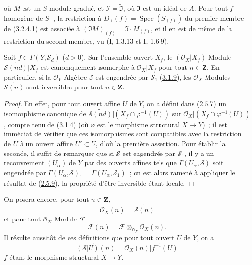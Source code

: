 
où $M$ est un $S$-module gradué, et
$\mathcal{I}=\widetilde{\mathfrak{I}}$, où $\mathfrak{I}$ est un idéal de
$A$. Pour tout $f$ homogène de $S_+$, la restriction à
$D_+(f)=\operatorname{Spec}(S_{(f)})$ du premier membre de
(\hyperref[II.3.2.4.1-fr]{3.2.4.1}) est associée à
$(\mathfrak{I}M)_{(f)}=\mathfrak{I}\cdot M_{(f)}$, et il en est de même de la
restriction du second membre, vu
(\hyperref[I.1.3.13-fr]{I, 1.3.13} et
\hyperref[I.1.6.9-fr]{I, 1.6.9}).

\begin{proposition}[3.2.5]
\label{II.3.2.5-fr}
Soit $f\in\Gamma(Y,\mathcal{S}_d)$ ($d>0$). Sur l'ensemble ouvert $X_f$, le
$(\mathcal{O}_X|X_f)$-Module
$\widetilde{\mathcal{S}(nd)}|X_f$ est canoniquement isomorphe à
$\mathcal{O}_X|X_f$ pour tout $n\in\mathbf{Z}$. En particulier, si la
$\mathcal{O}_Y$-Algèbre $\mathcal{S}$ est engendrée par $\mathcal{S}_1$
(\hyperref[II.3.1.9-fr]{3.1.9}), les $\mathcal{O}_X$-Modules
$\widetilde{\mathcal{S}(n)}$ sont inversibles pour tout $n\in\mathbf{Z}$.
\end{proposition}

\begin{proof}
En effet, pour tout ouvert affine $U$ de $Y$, on a défini dans
(\hyperref[II.2.5.7-fr]{2.5.7}) un isomorphisme canonique de
$\widetilde{\mathcal{S}(nd)}|(X_f\cap\varphi^{-1}(U))$ sur
$\mathcal{O}_X|(X_f\cap\varphi^{-1}(U))$, compte tenu de
(\hyperref[II.3.1.4-fr]{3.1.4}) (où $\varphi$ est le morphisme structural
$X\to Y$)~; il est immédiat de vérifier que ces isomorphismes sont compatibles
avec la restriction de $U$ à un ouvert affine $U'\subset U$, d'où la première
assertion. Pour établir la seconde, il suffit de remarquer que si
$\mathcal{S}$ est engendrée par $\mathcal{S}_1$, il y a un recouvrement
$(U_\alpha)$ de $Y$ par des ouverts affines tels que
$\Gamma(U_\alpha,\mathcal{S})$ soit engendrée par
$\Gamma(U_\alpha,\mathcal{S})_1=\Gamma(U_\alpha,\mathcal{S}_1)$~; on est alors
ramené à appliquer le résultat de (\hyperref[II.2.5.9-fr]{2.5.9}), la
propriété d'être inversible étant locale.
\end{proof}

On posera encore, pour tout $n\in\mathbf{Z}$,
\[
\label{II.3.2.5.1-fr}
  \mathcal{O}_X(n)=\widetilde{\mathcal{S}(n)}
\tag{3.2.5.1}
\]
et pour tout $\mathcal{O}_X$-Module $\mathcal{F}$
\[
\label{II.3.2.5.2-fr}
  \mathcal{F}(n)=\mathcal{F}\otimes_{\mathcal{O}_X}\mathcal{O}_X(n).
\tag{3.2.5.2}
\]
Il résulte aussitôt de ces définitions que pour tout ouvert $U$ de $Y$, on a
\[
  \widetilde{(\mathcal{S}|U)(n)}
  =\mathcal{O}_X(n)|f^{-1}(U)
\]
$f$ étant le morphisme structural $X\to Y$.

